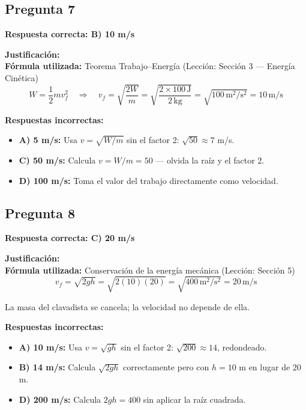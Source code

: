 \begin{respuestabox}
\subsection{Pregunta 7}
\textcolor{verdecorrecto}{\textbf{Respuesta correcta: B) 10 m/s}}

\textbf{Justificación:}\\
\textbf{Fórmula utilizada:} Teorema Trabajo--Energía (Lección: Sección 3 --- Energía Cinética)
$$W = \frac{1}{2}mv_f^2 \quad \Rightarrow \quad v_f = \sqrt{\frac{2W}{m}} = \sqrt{\frac{2 \times 100\,\text{J}}{2\,\text{kg}}} = \sqrt{100\,\text{m}^2/\text{s}^2} = 10\,\text{m/s}$$

\textbf{Respuestas incorrectas:}
\begin{itemize}
    \item \textbf{A) 5 m/s:} Usa $v = \sqrt{W/m}$ sin el factor 2: $\sqrt{50} \approx 7$ m/s.
    \item \textbf{C) 50 m/s:} Calcula $v = W/m = 50$ --- olvida la raíz y el factor 2.
    \item \textbf{D) 100 m/s:} Toma el valor del trabajo directamente como velocidad.
\end{itemize}
\end{respuestabox}

\begin{respuestabox}
\subsection{Pregunta 8}
\textcolor{verdecorrecto}{\textbf{Respuesta correcta: C) 20 m/s}}

\textbf{Justificación:}\\
\textbf{Fórmula utilizada:} Conservación de la energía mecánica (Lección: Sección 5)
$$v_f = \sqrt{2gh} = \sqrt{2(10)(20)} = \sqrt{400\,\text{m}^2/\text{s}^2} = 20\,\text{m/s}$$

La masa del clavadista se cancela; la velocidad no depende de ella.

\textbf{Respuestas incorrectas:}
\begin{itemize}
    \item \textbf{A) 10 m/s:} Usa $v = \sqrt{gh}$ sin el factor 2: $\sqrt{200} \approx 14$, redondeado.
    \item \textbf{B) 14 m/s:} Calcula $\sqrt{2gh}$ correctamente pero con $h = 10$ m en lugar de 20 m.
    \item \textbf{D) 200 m/s:} Calcula $2gh = 400$ sin aplicar la raíz cuadrada.
\end{itemize}
\end{respuestabox}

